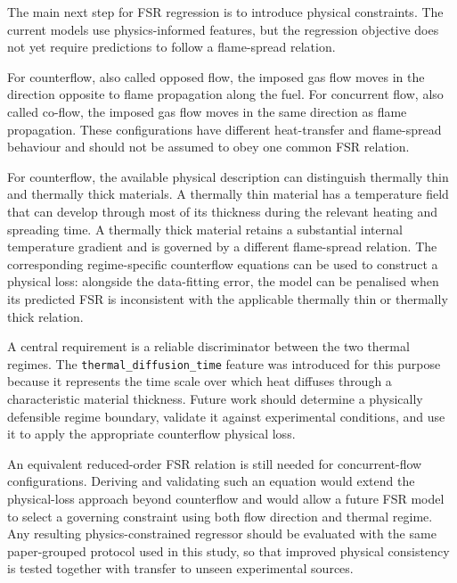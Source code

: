 The main next step for FSR regression is to introduce physical constraints.
The current models use physics-informed features, but the regression objective
does not yet require predictions to follow a flame-spread relation.

For counterflow, also called opposed flow, the imposed gas flow moves in the
direction opposite to flame propagation along the fuel. For concurrent flow,
also called co-flow, the imposed gas flow moves in the same direction as flame
propagation. These configurations have different heat-transfer and flame-spread
behaviour and should not be assumed to obey one common FSR relation.

For counterflow, the available physical description can distinguish thermally
thin and thermally thick materials. A thermally thin material has a temperature
field that can develop through most of its thickness during the relevant
heating and spreading time. A thermally thick material retains a substantial
internal temperature gradient and is governed by a different flame-spread
relation. The corresponding regime-specific counterflow equations can be used
to construct a physical loss: alongside the data-fitting error, the model can
be penalised when its predicted FSR is inconsistent with the applicable
thermally thin or thermally thick relation.

A central requirement is a reliable discriminator between the two thermal
regimes. The \texttt{thermal\_diffusion\_time} feature was introduced for this
purpose because it represents the time scale over which heat diffuses through
a characteristic material thickness. Future work should determine a
physically defensible regime boundary, validate it against experimental
conditions, and use it to apply the appropriate counterflow physical loss.

An equivalent reduced-order FSR relation is still needed for concurrent-flow
configurations. Deriving and validating such an equation would extend the
physical-loss approach beyond counterflow and would allow a future FSR model to
select a governing constraint using both flow direction and thermal regime.
Any resulting physics-constrained regressor should be evaluated with the same
paper-grouped protocol used in this study, so that improved physical
consistency is tested together with transfer to unseen experimental sources.
